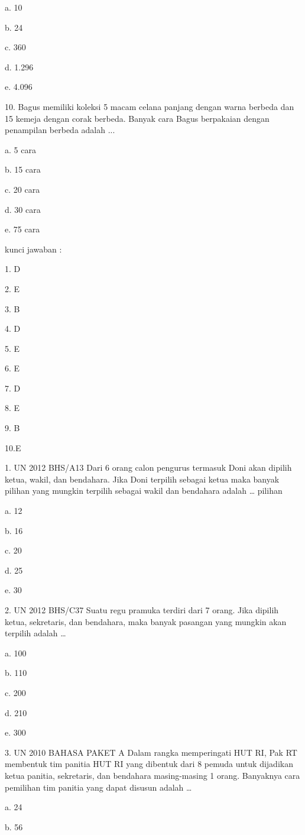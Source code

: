 \documentclass[11pt,fleqn]{book} %
\begin{document}
a.	10

b.	24

c.	360

d.	1.296

e.	4.096

10. Bagus memiliki koleksi 5 macam celana panjang dengan warna berbeda dan 15 kemeja dengan corak berbeda. Banyak cara Bagus berpakaian dengan penampilan berbeda adalah ... 

a.	5 cara

b.	15 cara

c.	20 cara

d.	30 cara

e.	75 cara



kunci jawaban :

1. D

2. E

3. B 

4. D

5. E

6. E

7. D

8. E

9. B

10.E


1.	UN 2012 BHS/A13
Dari 6 orang calon pengurus termasuk Doni akan dipilih ketua, wakil, dan bendahara. Jika Doni terpilih sebagai ketua maka banyak pilihan yang mungkin terpilih sebagai wakil dan bendahara adalah … pilihan

a.	12

b.	16

c.	20

d.	25

e.	30

2.	UN 2012 BHS/C37
Suatu regu pramuka terdiri dari 7 orang. Jika dipilih ketua, sekretaris, dan bendahara, maka banyak pasangan yang mungkin akan terpilih adalah …

a.	100

b.	110

c.	200

d.	210

e.	300

3.	UN 2010 BAHASA PAKET A 
Dalam rangka memperingati HUT RI, Pak RT membentuk tim panitia HUT RI yang dibentuk dari 8 pemuda untuk dijadikan ketua panitia, sekretaris, dan bendahara masing-masing 1 orang. Banyaknya cara pemilihan tim panitia yang dapat disusun adalah …

a.	24

b.	56
\end{document}
